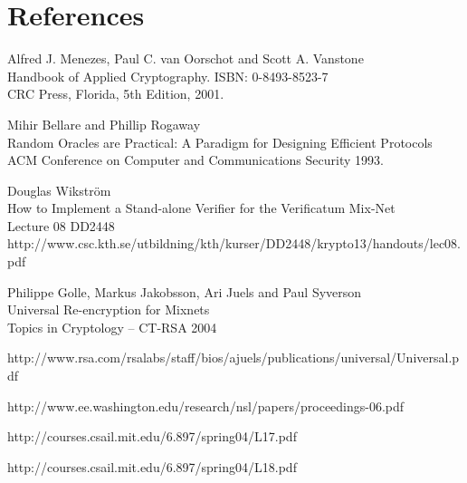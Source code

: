 \section{References}

\begin{thebibliography}{9}

  Alfred J. Menezes, Paul C. van Oorschot and Scott A. Vanstone\\
  Handbook of Applied Cryptography.
  ISBN: 0-8493-8523-7\\
  CRC Press, Florida,
  5th Edition,
  2001.

   Mihir Bellare and Phillip Rogaway\\
   Random Oracles are Practical: A Paradigm for Designing Efficient Protocols\\
   ACM Conference on Computer and Communications Security 1993.

   Douglas Wikström\\
   How to Implement a Stand-alone Verifier for the Verificatum Mix-Net\\

  Lecture 08 DD2448
  http://www.csc.kth.se/utbildning/kth/kurser/DD2448/krypto13/handouts/lec08.pdf

   Philippe Golle, Markus Jakobsson, Ari Juels and Paul Syverson\\
   Universal Re-encryption for Mixnets\\
   Topics in Cryptology – CT-RSA 2004

   http://www.rsa.com/rsalabs/staff/bios/ajuels/publications/universal/Universal.pdf


http://www.ee.washington.edu/research/nsl/papers/proceedings-06.pdf

  http://courses.csail.mit.edu/6.897/spring04/L17.pdf

  http://courses.csail.mit.edu/6.897/spring04/L18.pdf



\end{thebibliography}
